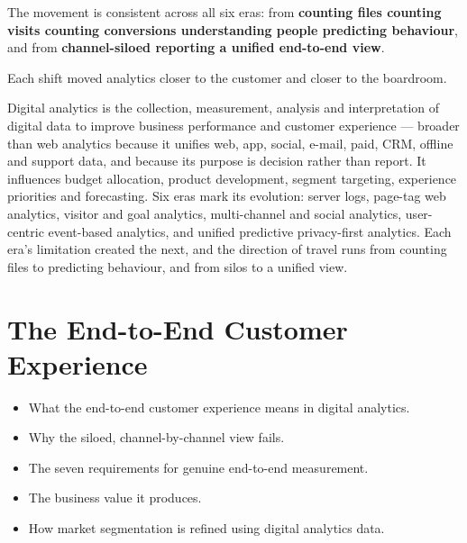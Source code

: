 \begin{keybox}
The movement is consistent across all six eras: from \textbf{counting files
\ra{} counting visits \ra{} counting conversions \ra{} understanding people
\ra{} predicting behaviour}, and from \textbf{channel-siloed reporting \ra{} a
unified end-to-end view}.

\smallskip
Each shift moved analytics closer to the customer and closer to the boardroom.
\end{keybox}

\begin{summarybox}
Digital analytics is the collection, measurement, analysis and interpretation of
digital data to improve business performance and customer experience --- broader
than web analytics because it unifies web, app, social, e-mail, paid, CRM, offline
and support data, and because its purpose is decision rather than report. It
influences budget allocation, product development, segment targeting, experience
priorities and forecasting. Six eras mark its evolution: server logs, page-tag web
analytics, visitor and goal analytics, multi-channel and social analytics,
user-centric event-based analytics, and unified predictive privacy-first
analytics. Each era's limitation created the next, and the direction of travel runs
from counting files to predicting behaviour, and from silos to a unified view.
\end{summarybox}

\chapter{The End-to-End Customer Experience}


\begin{learningoutcomes}
\begin{itemize}
\item What the end-to-end customer experience means in digital analytics.
\item Why the siloed, channel-by-channel view fails.
\item The seven requirements for genuine end-to-end measurement.
\item The business value it produces.
\item How market segmentation is refined using digital analytics data.
\end{itemize}
\end{learningoutcomes}

